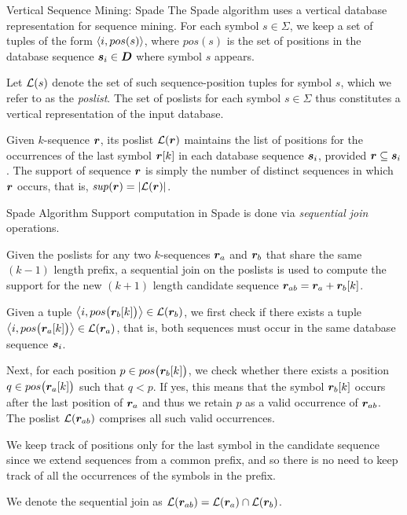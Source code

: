\ifdefined\wox \begin{frame} \titlepage \end{frame} \fi

\begin{frame}{Vertical Sequence Mining: Spade}
The Spade algorithm uses a vertical database representation for sequence
mining. For each symbol $s \in \Sigma$, we keep a
set of tuples of the form $\langle i, pos(s) \rangle$, where
$pos(s)$ is the set of positions in the database sequence
${\boldsymbol s}_i \in {\boldsymbol D}$ where symbol $s$
appears. 

\medskip
Let ${\mathcal L}(s)$ denote the set of such sequence-position tuples
for symbol $s$,
which we refer to as the {\em poslist}.
The set of poslists for each symbol $s \in \Sigma$ thus constitutes a
vertical representation of the input database.

\medskip
Given $k$-sequence
${\boldsymbol r}$, its poslist ${\mathcal L}({\boldsymbol r})$
maintains the list of positions for the occurrences
of the last symbol ${\boldsymbol r}[k]$ in each database sequence ${\boldsymbol s}_i$, provided
${\boldsymbol r} \subseteq {\boldsymbol s}_i$. The support of sequence ${\boldsymbol r}$ is simply the
number of distinct sequences in which ${\boldsymbol r}$ occurs, that is,
$\mathit{sup}({\boldsymbol r}) =
|{\mathcal L}({\boldsymbol r})|$.

\end{frame}

\begin{frame}{Spade Algorithm}
Support computation in Spade is done via {\em sequential join}
operations.  

\medskip
Given the poslists for any two
$k$-sequences ${\boldsymbol r}_a$ and ${\boldsymbol r}_b$ that share the same $(k-1)$ length
pref\/{i}x, a sequential join on the poslists is used to
compute the support for the new $(k+1)$ length candidate sequence
${\boldsymbol r}_{ab} = {\boldsymbol r}_a + {\boldsymbol r}_b[k]$.  

\medskip 
Given a tuple ${\big\langle i,pos\bigl({\boldsymbol r}_b[k]\bigr) \big\rangle} \in
{\mathcal L}({\boldsymbol r}_b)$, we f\/{i}rst check if there exists a tuple
${\big\langle i,pos\bigl({\boldsymbol r}_a[k]\bigr) \big\rangle} \in {\mathcal L}({\boldsymbol r}_a)$, that is, both
sequences must occur in the same database sequence ${\boldsymbol s}_i$. 

\smallskip
Next, for
each position $p \in pos\bigl({\boldsymbol r}_b[k]\bigr)$, we check whether there
exists a position $q \in pos\bigl({\boldsymbol r}_a[k]\bigr)$ such that $q < p$. If
yes, this means that the symbol ${\boldsymbol r}_b[k]$ occurs after the last
position of ${\boldsymbol r}_a$ and thus we retain $p$ as a valid occurrence of
${\boldsymbol r}_{ab}$. The poslist ${\mathcal L}({\boldsymbol r}_{ab})$ comprises all such valid
occurrences.  

\medskip
We keep track of positions only for the last
symbol in the candidate sequence since we extend sequences
from a common pref\/{i}x, and so there is no need to keep track of all the
occurrences of the symbols in the pref\/{i}x.  

\medskip
We denote the sequential
join as ${\mathcal L}({\boldsymbol r}_{ab}) = {\mathcal L}({\boldsymbol r}_a) \cap {\mathcal L}({\boldsymbol r}_b)$.

\end{frame}


